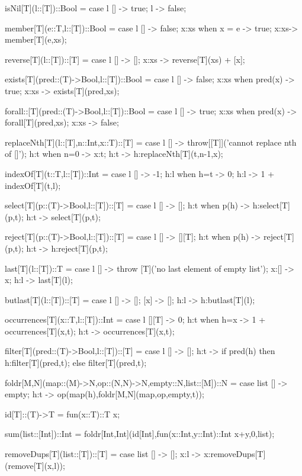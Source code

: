 \documentclass[5p,times]{elsarticle}
\begin{document}
\begin{FigESL}
isNil[T](l::[T])::Bool =
  case l {
    [] -> true;
    l -> false;
  }
  
member[T](e::T,l::[T])::Bool =
  case l {
    [] -> false;
    x:xs when x = e -> true;
    x:xs-> member[T](e,xs);
  }
  
reverse[T](l::[T])::[T] =
  case l {
    [] -> [];
    x:xs -> reverse[T](xs) + [x];
  }

exists[T](pred::(T)->Bool,l::[T])::Bool =
  case l {
    [] -> false;
    x:xs when pred(x) -> true;
    x:xs -> exists[T](pred,xs);
  }

forall::[T](pred::(T)->Bool,l::[T])::Bool =
  case l {
    [] -> true;
    x:xs when pred(x) -> forall[T](pred,xs);
    x:xs -> false;
  }
  
replaceNth[T](l::[T],n::Int,x::T)::[T] = 
  case l {
    [] -> throw[[T]]('cannot replace nth of []');
    h:t when n=0 -> x:t;
    h:t -> h:replaceNth[T](t,n-1,x);
  }

indexOf[T](t::T,l::[T])::Int =
  case l {
    [] -> -1;
    h:l when h=t -> 0;
    h:l -> 1 + indexOf[T](t,l);
  }
  
select[T](p::(T)->Bool,l::[T])::[T] =
  case l {
    [] -> [];
    h:t when p(h) -> h:select[T](p,t);
    h:t -> select[T](p,t);
  }
  
reject[T](p::(T)->Bool,l::[T])::[T] =
  case l {
    [] -> [][T];
    h:t when p(h) -> reject[T](p,t);
    h:t -> h:reject[T](p,t);
  }
  
last[T](l::[T])::T =
  case l {
    [] -> throw [T]('no last element of empty list');
    x:[] -> x;
    h:l -> last[T](l);
  }
  
butlast[T](l::[T])::[T] =
  case l {
    [] -> [];
    [x] -> [];
    h:l -> h:butlast[T](l);
  }

occurrences[T](x::T,l::[T])::Int =
  case l {
    [][T] -> 0;
    h:t when h=x -> 1 + occurrences[T](x,t);
    h:t -> occurrences[T](x,t);
  }
  
filter[T](pred::(T)->Bool,l::[T])::[T] = 
  case l {
    [] -> [];
    h:t ->
      if pred(h) 
      then h:filter[T](pred,t);
      else filter[T](pred,t);
  }
  
foldr[M,N](map::(M)->N,op::(N,N)->N,empty::N,list::[M])::N =
  case list {
    [] -> empty;
    h:t -> op(map(h),foldr[M,N](map,op,empty,t));
  }
  
id[T]::(T)->T = fun(x::T)::T x;
  
sum(list::[Int])::Int = 
  foldr[Int,Int](id[Int],fun(x::Int,y::Int)::Int x+y,0,list);

removeDups[T](list::[T])::[T] =
  case list {
    [] -> [];
    x:l -> x:removeDups[T](remove[T](x,l));
  }
  

\end{FigESL}
\end{document}

